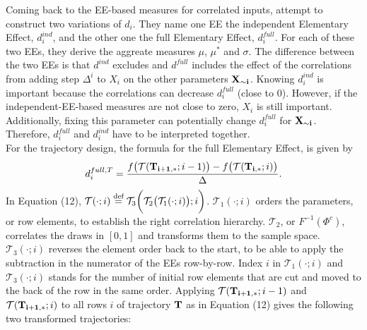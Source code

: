\noindent
Coming back to the EE-based measures for correlated inputs, \cite{ge2017extending} attempt to construct two variations of $d_i$. They name one EE the independent Elementary Effect, $d_i^{ind}$, and the other one the full Elementary Effect, $d_i^{full}$. For each of these two EEs, they derive the aggreate measures $\mu$, $\mu^*$ and $\sigma$. The difference between the two EEs is that $d^{ind}$ excludes and $d^{full}$ includes the effect of the correlations from adding step $\Delta^i$ to $X_i$ on the other parameters $\bold{X_{\sim i}}$. Knowing $d_i^{ind}$ is important because the correlations can decrease $d_i^{full}$ (close to 0). However, if the independent-EE-based measures are not close to zero, $X_i$ is still important. Additionally, fixing this parameter can potentially change $d_i^{full}$ for $\bold{X_{\sim i}}$. Therefore, $d_i^{full}$ and $d_i^{ind}$ have to be interpreted together.\\

\noindent 
For the trajectory design, the formula for the full Elementary Effect, is given by
\begin{align} \label{eq:d_full}
d_i^{full,T} = \frac{f\big(\mathcal{T}(\bold{T_{i+1,*}}; i-1)\big) - f\big(\mathcal{T}(\bold{T_{i,*}}; i)\big)}{\Delta}.
\end{align}
In Equation (12), $\mathcal{T}(\cdot; i) \stackrel{\text{def}}{=} \mathcal{T}_3\bigg(\mathcal{T}_2\big(\mathcal{T}_1(\cdot; i)\big); i\bigg)$. $\mathcal{T}_1(\cdot; i)$ orders the parameters, or row elements, to establish the right correlation hierarchy. $\mathcal{T}_2$, or $F^{-1}(\Phi^c)$, correlates the draws in $[0,1]$ and transforms them to the sample space. $\mathcal{T}_3(\cdot; i)$ reverses the element order back to the start, to be able to apply the subtraction in the numerator of the EEs row-by-row. Index $i$ in $\mathcal{T}_1(\cdot; i)$ and $\mathcal{T}_3(\cdot; i)$ stands for the number of initial row elements that are cut and moved to the back of the row in the same order. Applying $\mathcal{T}(\bold{T_{i+1,*}}; i-1)$ and $\mathcal{T}(\bold{T_{i+1,*}}; i)$ to all rows $i$ of trajectory $\bold{T}$ as in Equation (12) gives the following two transformed trajectories:

